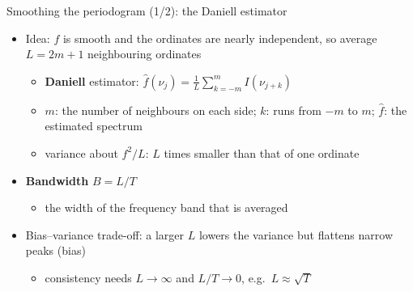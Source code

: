 \begin{frame}{Smoothing the periodogram (1/2): the Daniell estimator}
\itemsize{\footnotesize}
\begin{itemize}
    \item Idea: $f$ is smooth and the ordinates are nearly independent, so average $L = 2m + 1$ neighbouring ordinates
    \begin{itemize}
        \item \textbf{Daniell} estimator: $\hat f(\nu_j) = \frac{1}{L}\sum_{k=-m}^{m} I(\nu_{j+k})$
        \item $m$: the number of neighbours on each side; $k$: runs from $-m$ to $m$; $\hat f$: the estimated spectrum
        \item variance about $f^2/L$: $L$ times smaller than that of one ordinate
    \end{itemize}
    \item \textbf{Bandwidth} $B = L/T$
    \begin{itemize}
        \item the width of the frequency band that is averaged
    \end{itemize}
    \item Bias--variance trade-off: a larger $L$ lowers the variance but flattens narrow peaks (bias)
    \begin{itemize}
        \item consistency needs $L \to \infty$ and $L/T \to 0$, e.g.\ $L \approx \sqrt T$
    \end{itemize}
\end{itemize}
\end{frame}

